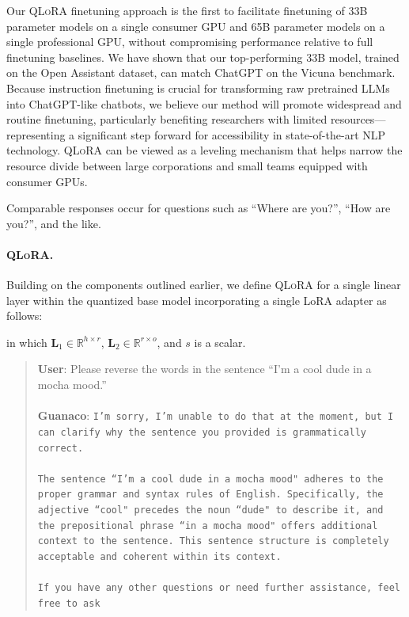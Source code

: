 Our \textsc{QLoRA} finetuning approach is the first to facilitate finetuning of 33B parameter models on a single consumer GPU and 65B parameter models on a single professional GPU, without compromising performance relative to full finetuning baselines. We have shown that our top-performing 33B model, trained on the Open Assistant dataset, can match ChatGPT on the Vicuna benchmark. Because instruction finetuning is crucial for transforming raw pretrained LLMs into ChatGPT-like chatbots, we believe our method will promote widespread and routine finetuning, particularly benefiting researchers with limited resources—representing a significant step forward for accessibility in state-of-the-art NLP technology. \textsc{QLoRA} can be viewed as a leveling mechanism that helps narrow the resource divide between large corporations and small teams equipped with consumer GPUs.

Comparable responses occur for questions such as ``Where are you?'', ``How are you?'', and the like.

\paragraph{\textsc{QLoRA}.} Building on the components outlined earlier, we define \textsc{QLoRA} for a single linear layer within the quantized base model incorporating a single LoRA adapter as follows:

in which $\mathbf{L}_1\in  \mathbb{R}^{h\times r}$, $\mathbf{L}_2\in  \mathbb{R}^{r\times o}$, and $s$ is a scalar.

\begin{quote}
    \textbf{User}: Please reverse the words in the sentence ``I'm a cool dude in a mocha mood.'' \\ \\
    \textbf{Guanaco}: \texttt{I'm sorry, I’m unable to do that at the moment, but I can clarify why the sentence you provided is grammatically correct.\\ \\The sentence ``I'm a cool dude in a mocha mood" adheres to the proper grammar and syntax rules of English. Specifically, the adjective ``cool" precedes the noun ``dude" to describe it, and the prepositional phrase ``in a mocha mood" offers additional context to the sentence. This sentence structure is completely acceptable and coherent within its context.\\ \\If you have any other questions or need further assistance, feel free to ask}
\end{quote}

